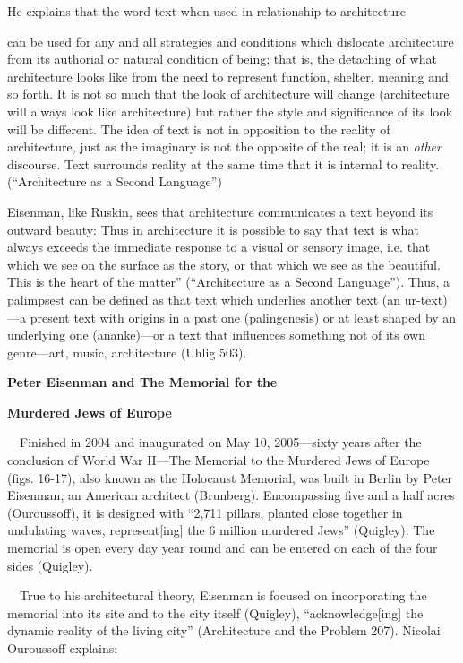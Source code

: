 {\color{black}
He explains that the word {\textquotedbl}text{\textquotedbl} when used
in relationship to architecture }

{\color{black}
can be used for any and all strategies and conditions which dislocate
architecture from its authorial or natural condition of being; that is,
the detaching of what architecture looks like from the need to
represent function, shelter, meaning and so forth.  It is not so much
that the look of architecture will change (architecture will always
look like architecture) but rather the style and significance of its
look will be different.  The idea of text is not in opposition to the
reality of architecture, just as the imaginary is not the opposite of
the real; it is an \textit{other }discourse.  Text surrounds reality at
the same time that it is internal to reality.  (“Architecture as a
Second Language”)}

{\color{black}
Eisenman, like Ruskin, sees that architecture communicates a text beyond
its outward beauty: {\textquotedbl}Thus in architecture it is possible
to say that text is what always exceeds the immediate response to a
visual or sensory image, i.e. that which we see on the surface as the
story, or that which we see as the beautiful.  This is the heart of the
matter” (“Architecture as a Second Language”).  Thus, a palimpsest can
be defined as that text which underlies another text (an ur-text)—a
present text with origins in a past one (palingenesis) or at least
shaped by an underlying one (ananke)—or a text that influences
something not of its own genre—art, music, architecture (Uhlig 503). }

{\centering\color{black}
\textbf{Peter Eisenman and The Memorial for the }
\par}

{\centering\color{black}
\textbf{Murdered Jews of Europe}
\par}

\ \ Finished in 2004 and inaugurated on May 10, 2005—sixty years after
the conclusion of World War II—The Memorial to the Murdered Jews of
Europe (figs. 16-17), also known as the Holocaust Memorial, was built
in Berlin by Peter Eisenman, an American architect (Brunberg). 
Encompassing five and a half acres (Ouroussoff), it is designed with
“2,711 pillars, planted close together in undulating waves,
represent[ing] the 6 million murdered Jews” (Quigley).  The memorial is
open every day year round and can be entered on each of the four sides
(Quigley).  

\ \ True to his architectural theory, Eisenman is focused on
incorporating the memorial into its site and to the city itself
(Quigley), “acknowledge[ing] the dynamic reality of the living city”
({\textquotedbl}Architecture and the Problem{\textquotedbl} 207). 
Nicolai Ouroussoff explains: 


